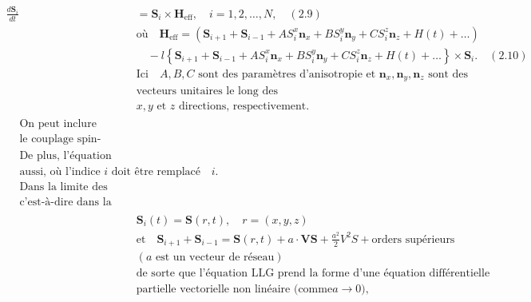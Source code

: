 \documentclass{article}
\begin{document}
	\begin{align}
	\frac{{d\mathbf{S}_i}}{{dt}} &= \mathbf{S}_i \times \mathbf{H}_{\text{eff}}, \quad i = 1, 2, \ldots, N, \quad (2.9) \nonumber \\
	&\text{où} \quad \mathbf{H}_{\text{eff}} = \left( \mathbf{S}_{i+1} + \mathbf{S}_{i-1} + AS_{i}^{x}\mathbf{n}_x + BS_{i}^{y}\mathbf{n}_y + CS_{i}^{z}\mathbf{n}_z + H(t) + \ldots \right) \nonumber \\
	&\quad - l \left\{ \mathbf{S}_{i+1} + \mathbf{S}_{i-1} + AS_{i}^{x}\mathbf{n}_x + BS_{i}^{y}\mathbf{n}_y + CS_{i}^{z}\mathbf{n}_z + H(t) + \ldots \right\} \times \mathbf{S}_i. \quad (2.10) \nonumber \\
	&\text{Ici} \quad A, B, C \text{ sont des paramètres d'anisotropie et } \mathbf{n}_x, \mathbf{n}_y, \mathbf{n}_z \text{ sont des} \nonumber \\
	&\text{vecteurs unitaires le long des} \nonumber \\
	&x, y \text{ et } z \text{ directions, respectivement.} \nonumber \\
	\begin{split}
	&\text{On peut inclure d'autres types d'interactions comme l'échange biquadratique,} \\
	&\text{le couplage spin-phonon, les interactions dipolaires, etc.} \nonumber \\
	&\text{De plus, l'équation (2.9) peut être généralisée au cas de réseaux carrés et cubiques}  \nonumber \\
	&\text{aussi, où l'indice } i \text{ doit être remplacé par le vecteur de réseau approprié } i. \nonumber \\
	&\text{Dans la limite des longueurs d'onde longues et des basses températures,} \nonumber \\
	&\text{c'est-à-dire dans la limite continue, on peut écrire}
	\end{split} \nonumber \\
	&\mathbf{S}_i(t) = \mathbf{S}(r, t), \quad r = (x, y, z) \nonumber \\
	&\text{et} \quad \mathbf{S}_{i+1} + \mathbf{S}_{i-1} = \mathbf{S}(r, t) + a \cdot \mathbf{VS} + \frac{a^2}{2}V^2S + \text{orders supérieurs} \nonumber \\
	&(a \text{ est un vecteur de réseau}) \nonumber \\
	&\text{de sorte que l'équation LLG prend la forme d'une équation différentielle } \nonumber \\
	&\text{partielle vectorielle non linéaire (comme}a \rightarrow 0), \nonumber \\

\end{align}
\end{document}
